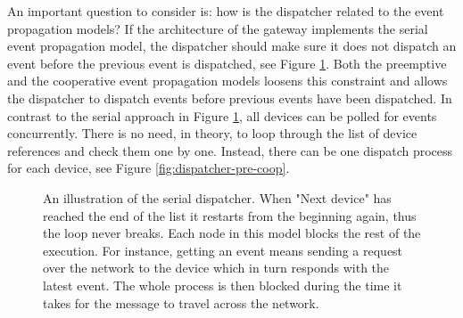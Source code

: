 An important question to consider is: how is the dispatcher related to the
event propagation models? If the architecture of the gateway implements the
serial event propagation model, the dispatcher should make sure it does not
dispatch an event before the previous event is dispatched, see Figure
\ref{fig:dispatcher-serial}. Both the preemptive and the cooperative event
propagation models loosens this constraint and allows the dispatcher to
dispatch events before previous events have been dispatched. In contrast to the
serial approach in Figure \ref{fig:dispatcher-serial}, all devices can be
polled for events concurrently. There is no need, in theory, to loop through
the list of device references and check them one by one. Instead, there can be
one dispatch process for each device, see Figure \ref{fig:dispatcher-pre-coop}.

\begin{figure}[h!]
    \centering

    \caption[An illustration of the serial dispatcher.]{An illustration of the
    serial dispatcher. When "Next device" has reached the end of the list it
    restarts from the beginning again, thus the loop never breaks. Each node in
    this model blocks the rest of the execution. For instance, getting an event
    means sending a request over the network to the device which in turn
    responds with the latest event. The whole process is then blocked during
    the time it takes for the message to travel across the network.}

    \label{fig:dispatcher-serial}
\end{figure}

